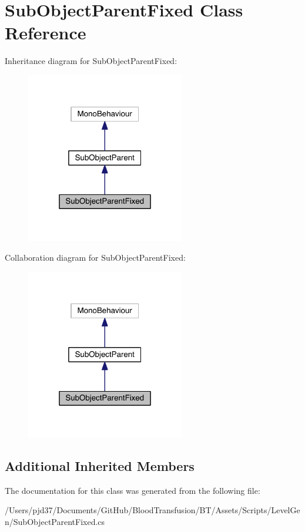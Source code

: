 \hypertarget{class_sub_object_parent_fixed}{}\section{Sub\+Object\+Parent\+Fixed Class Reference}
\label{class_sub_object_parent_fixed}


Inheritance diagram for Sub\+Object\+Parent\+Fixed\+:\nopagebreak
\begin{figure}[H]
\begin{center}
\leavevmode
\includegraphics[width=196pt]{class_sub_object_parent_fixed__inherit__graph}
\end{center}
\end{figure}


Collaboration diagram for Sub\+Object\+Parent\+Fixed\+:\nopagebreak
\begin{figure}[H]
\begin{center}
\leavevmode
\includegraphics[width=196pt]{class_sub_object_parent_fixed__coll__graph}
\end{center}
\end{figure}
\subsection*{Additional Inherited Members}


The documentation for this class was generated from the following file\+:\begin{DoxyCompactItemize}
\item 
/\+Users/pjd37/\+Documents/\+Git\+Hub/\+Blood\+Transfusion/\+B\+T/\+Assets/\+Scripts/\+Level\+Gen/Sub\+Object\+Parent\+Fixed.\+cs\end{DoxyCompactItemize}
